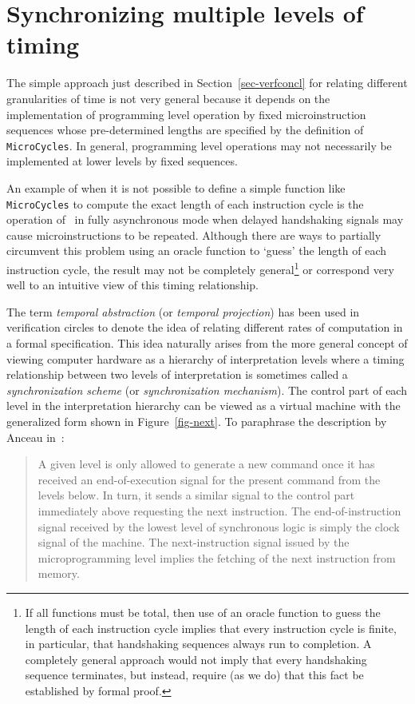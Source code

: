 \section{Synchronizing multiple levels of timing}
\label{sec-temp}

The simple approach just described in Section~\ref{sec-verfconcl}
for relating
different granularities of time is not very general because
it depends on the implementation of programming level operation
by fixed microinstruction sequences whose pre-determined lengths
are specified by the definition of \verb"MicroCycles".
In general, programming level operations may not
necessarily be implemented at lower levels by fixed sequences.

An example of when
it is not possible to define a simple function like \verb"MicroCycles"
to compute the exact length of each instruction cycle
is the operation of \Tamarack\ in fully asynchronous mode
when delayed handshaking signals
may cause microinstructions to be repeated.
Although there are ways
to partially circumvent this problem
using an oracle function
to `guess' the length of each instruction cycle,
the result may not be completely
general\footnote{
If all functions must be total,
then use of an oracle function to guess the length of each
instruction cycle implies that every instruction cycle
is finite, in particular,
that handshaking sequences always run to completion.
A completely general approach would
not imply that every handshaking sequence terminates,
but instead, require (as we do) that this fact be established by
formal proof.}
or correspond very well to an intuitive view of this
timing relationship.

The term {\it temporal abstraction}
(or {\it temporal projection})
has been used
in verification circles
\cite{Eveking,Dhingra:thesis,Hale:thesis,Herbert:thesis,Melham:calgary86,Moszkowski:thesis,Subra:calgary86}
to denote the idea of relating
different rates of computation in a formal specification.
This idea naturally arises from the more general concept
of viewing computer hardware as a hierarchy of interpretation levels
where a timing relationship between two levels of interpretation
is sometimes called a {\it synchronization scheme}
(or {\it synchronization mechanism}).
The control part of
each level in the interpretation hierarchy can be
viewed as a virtual machine with the generalized form shown
in Figure~\ref{fig-next}.
To paraphrase the description by Anceau in~\cite{Anceau}:

\begin{quotation}
A given level is only allowed to generate a new command
once it has received an end-of-execution signal for the present
command from the levels below.
In turn, it sends a similar signal to the control part
immediately above requesting the next instruction.
The end-of-instruction signal received by the lowest level
of synchronous logic is simply the clock signal of the machine.
The next-instruction signal issued by the microprogramming
level implies the fetching of the next instruction from memory.
\end{quotation}

